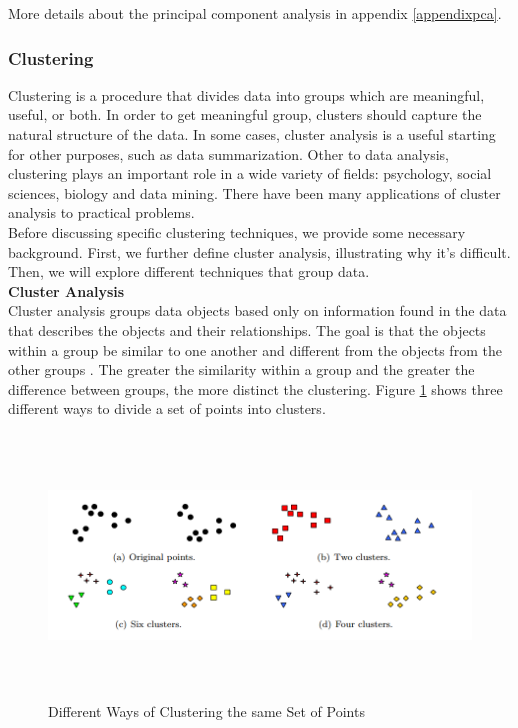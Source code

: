 More details about the principal component analysis in appendix \ref{appendixpca}.


\subsubsection{Clustering}
Clustering is a procedure that divides data into groups which are meaningful, useful, or both. In order to get meaningful group, clusters should capture the natural structure of the data. In some cases, cluster analysis is a useful starting for other purposes, such as data summarization. Other to data analysis, clustering plays an important role in a wide variety of fields: psychology, social sciences, biology and data mining. There have been many applications of cluster analysis to practical problems. \\

Before discussing specific clustering techniques, we provide some necessary background. First, we further define cluster analysis, illustrating why it's difficult. Then, we will explore different techniques that group data.\\

\textbf{\normalsize{Cluster Analysis}}\\

Cluster analysis groups data objects based only on information found in the data that describes the objects and their relationships. The goal is that the objects within a group be similar to one another and different from the objects from the other groups \cite{cite11}. The greater the similarity within a group and the greater the difference between groups, the more distinct the clustering. Figure \ref{fig4} shows three different ways to divide a set of points into clusters. \\
\begin{figure}[H]
\begin{center}
\includegraphics[width=15cm,height=7cm]{chapter2prime/fig1.png}
\end{center}
\caption{Different Ways of Clustering the same Set of Points}
\label{fig4}
\end{figure}

